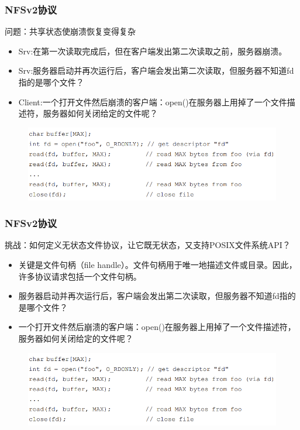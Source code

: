 \begin{frame}[fragile]
    \frametitle{NFSv2协议}
    问题：共享状态使崩溃恢复变得复杂
    \begin{itemize}
        \item Srv:在第一次读取完成后，但在客户端发出第二次读取之前，服务器崩溃。
        \item Srv:服务器启动并再次运行后，客户端会发出第二次读取，但服务器不知道fd指的是哪个文件？
        \item Client:一个打开文件然后崩溃的客户端：open()在服务器上用掉了一个文件描述符，服务器如何关闭给定的文件呢？
    \end{itemize}
    \begin{figure}
        \includegraphics[width=0.8\linewidth]{figs/stateful-code.png}
    \end{figure}

\end{frame}

\begin{frame}[fragile]
    \frametitle{NFSv2协议}
    挑战：如何定义无状态文件协议，让它既无状态，又支持POSIX文件系统API？
    \begin{itemize}
        \item 关键是文件句柄（file handle）。文件句柄用于唯一地描述文件或目录。因此，许多协议请求包括一个文件句柄。        
        \item 服务器启动并再次运行后，客户端会发出第二次读取，但服务器不知道fd指的是哪个文件？
        \item 一个打开文件然后崩溃的客户端：open()在服务器上用掉了一个文件描述符，服务器如何关闭给定的文件呢？
    \end{itemize}
    \begin{figure}
        \includegraphics[width=0.8\linewidth]{figs/stateful-code.png}
    \end{figure}
    
\end{frame}



